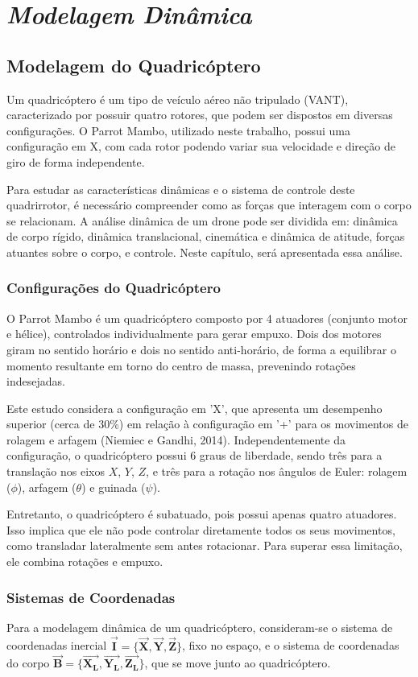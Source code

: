 \chapter{\textit{Modelagem Dinâmica}}

\section{Modelagem do Quadricóptero}
Um quadricóptero é um tipo de veículo aéreo não tripulado (VANT), caracterizado por possuir quatro rotores, que podem ser dispostos em diversas configurações. O Parrot Mambo, utilizado neste trabalho, possui uma configuração em X, com cada rotor podendo variar sua velocidade e direção de giro de forma independente.

Para estudar as características dinâmicas e o sistema de controle deste quadrirrotor, é necessário compreender como as forças que interagem com o corpo se relacionam. A análise dinâmica de um drone pode ser dividida em: dinâmica de corpo rígido, dinâmica translacional, cinemática e dinâmica de atitude, forças atuantes sobre o corpo, e controle. Neste capítulo, será apresentada essa análise.

\subsection{Configurações do Quadricóptero}
O Parrot Mambo é um quadricóptero composto por 4 atuadores (conjunto motor e hélice), controlados individualmente para gerar empuxo. Dois dos motores giram no sentido horário e dois no sentido anti-horário, de forma a equilibrar o momento resultante em torno do centro de massa, prevenindo rotações indesejadas.

Este estudo considera a configuração em 'X', que apresenta um desempenho superior (cerca de 30\%) em relação à configuração em '+' para os movimentos de rolagem e arfagem (Niemiec e Gandhi, 2014). Independentemente da configuração, o quadricóptero possui 6 graus de liberdade, sendo três para a translação nos eixos \(X\), \(Y\), \(Z\), e três para a rotação nos ângulos de Euler: rolagem (\(\phi\)), arfagem (\(\theta\)) e guinada (\(\psi\)).

Entretanto, o quadricóptero é subatuado, pois possui apenas quatro atuadores. Isso implica que ele não pode controlar diretamente todos os seus movimentos, como transladar lateralmente sem antes rotacionar. Para superar essa limitação, ele combina rotações e empuxo.

\subsection{Sistemas de Coordenadas}
Para a modelagem dinâmica de um quadricóptero, consideram-se o sistema de coordenadas inercial $\boldsymbol{\vec{I}} = \{\boldsymbol{\vec{X}}, \boldsymbol{\vec{Y}}, \boldsymbol{\vec{Z}}\}$, fixo no espaço, e o sistema de coordenadas do corpo $\boldsymbol{\vec{B}} = \{\boldsymbol{\vec{X_L}}, \boldsymbol{\vec{Y_L}}, \boldsymbol{\vec{Z_L}}\}$, que se move junto ao quadricóptero.

